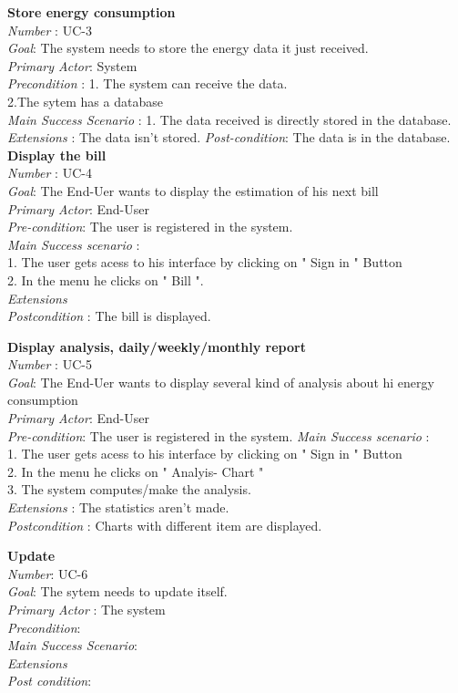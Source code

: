 \textbf{Store energy consumption}\\
\textit{Number} : UC-3 \\
\textit{Goal}: The system needs to store the energy data it just received. \\
\textit{Primary Actor}: System \\
\textit{Precondition} : 1. The system can receive the data. \\
2.The sytem has a database \\
\textit{Main Success Scenario} : 1. The data received is directly stored in the database. \\
\textit{Extensions} : The data isn't stored. %
\textit{Post-condition}: The data is in the database.\\

\textbf{Display the bill}\\
\textit{Number} : UC-4 \\
\textit{Goal}: The End-Uer wants to display the estimation of his next bill \\ 
\textit{Primary Actor}:  End-User \\
\textit{Pre-condition}: The user is registered in the system.\\
\textit{Main Success scenario} : \\
1. The user gets acess to his interface by clicking on " Sign in " Button\\
2. In the menu he clicks on " Bill ".\\
\textit{Extensions} \\
\textit{Postcondition} : The bill is displayed.

\textbf{Display analysis, daily/weekly/monthly report}\\ %
\textit{Number} : UC-5 \\
\textit{Goal}: The End-Uer wants to display several kind of analysis about hi energy consumption \\ 
\textit{Primary Actor}: End-User \\
\textit{Pre-condition}: The user is registered in the system.
\textit{Main Success scenario} : \\
1. The user gets acess to his interface by clicking on " Sign in " Button \\
2. In the menu he clicks on " Analyis- Chart " \\ 
3. The system computes/make the analysis. \\
\textit{Extensions} : The statistics aren't made. \\
\textit{Postcondition} : Charts with different item are displayed.

\textbf{Update}\\
\textit{Number}: UC-6 \\
\textit{Goal}: The sytem needs to update itself. \\
\textit{Primary Actor} : The system \\
\textit{Precondition}: \\
\textit{Main Success Scenario}: \\
\textit{Extensions} \\
\textit{Post condition}: \\
